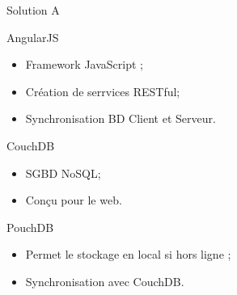 \author{Juan \textsc{Bermudez}}
\begin{frame}{Solution A}
		\begin{block}{AngularJS}
		\begin{itemize}
			\item Framework JavaScript ;
			\item Création de serrvices RESTful;
			\item Synchronisation BD Client et Serveur.
		\end{itemize}
		\end{block}
		\begin{block}{CouchDB}
			\begin{itemize}
			\item SGBD NoSQL;
			\item Conçu pour le web.
			\end{itemize}
		\end{block}
		\begin{block}{PouchDB}
			\begin{itemize}
			\item Permet le stockage en local si hors ligne ;
			\item Synchronisation avec CouchDB. 
			\end{itemize}
		\end{block}
\end{frame}
